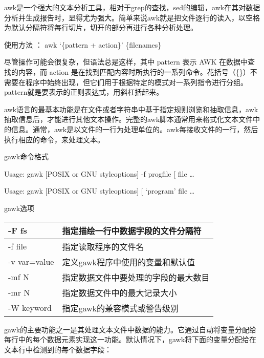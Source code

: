 \documentclass[letterpaper,12pt,english]{sphinxmanual}
\begin{document}


awk是一个强大的文本分析工具，相对于grep的查找，sed的编辑，awk在其对数据分析并生成报告时，显得尤为强大。简单来说awk就是把文件逐行的读入，以空格为默认分隔符将每行切片，切开的部分再进行各种分析处理。

使用方法   ： awk ‘\{pattern + action\}’ \{filenames\}

尽管操作可能会很复杂，但语法总是这样，其中 pattern 表示 AWK 在数据中查找的内容，而 action 是在找到匹配内容时所执行的一系列命令。花括号（\{\}）不需要在程序中始终出现，但它们用于根据特定的模式对一系列指令进行分组。 pattern就是要表示的正则表达式，用斜杠括起来。

awk语言的最基本功能是在文件或者字符串中基于指定规则浏览和抽取信息，awk抽取信息后，才能进行其他文本操作。完整的awk脚本通常用来格式化文本文件中的信息。通常，awk是以文件的一行为处理单位的。awk每接收文件的一行，然后执行相应的命令，来处理文本。

gawk命令格式

Usage: gawk {[}POSIX or GNU styleoptions{]} -f progfile {[}\textendash{}{]} file …

Usage: gawk {[}POSIX or GNU styleoptions{]} {[}\textendash{}{]} ‘program’ file …

gawk选项


\begin{savenotes}\sphinxattablestart
\centering
\begin{tabulary}{\linewidth}[t]{|T|T|}
\hline
\sphinxstyletheadfamily 
-F fs
&\sphinxstyletheadfamily 
指定描绘一行中数据字段的文件分隔符
\\
\hline
-f file
&
指定读取程序的文件名
\\
\hline
-v var=value
&
定义gawk程序中使用的变量和默认值
\\
\hline
-mf N
&
指定数据文件中要处理的字段的最大数目
\\
\hline
-mr N
&
指定数据文件中的最大记录大小
\\
\hline
-W keyword
&
指定gawk的兼容模式或警告级别
\\
\hline
\end{tabulary}
\par
\sphinxattableend\end{savenotes}

gawk的主要功能之一是其处理文本文件中数据的能力。它通过自动将变量分配给每行中的每个数据元素实现这一功能。默认情况下，gawk将下面的变量分配给在文本行中检测到的每个数据字段：
\end{document}

